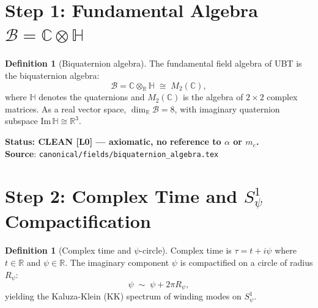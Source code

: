 \documentclass[12pt,a4paper]{article}
\theoremstyle{definition}
\newtheorem{definition}[theorem]{Definition}
\theoremstyle{remark}
\begin{document}
\section{Step 1: Fundamental Algebra $\mathcal{B} = \mathbb{C}\otimes\mathbb{H}$}
\label{sec:bc:algebra}

\begin{definition}[Biquaternion algebra]
\label{def:bc:biquaternion}
The fundamental field algebra of UBT is the biquaternion algebra:
\begin{equation}
  \mathcal{B} = \mathbb{C}\otimes_{\mathbb{R}}\mathbb{H}
  \;\cong\; M_2(\mathbb{C}),
  \label{eq:bc:B_def}
\end{equation}
where $\mathbb{H}$ denotes the quaternions and $M_2(\mathbb{C})$ is the algebra
of $2\times2$ complex matrices.  As a real vector space,
$\dim_{\mathbb{R}}\mathcal{B} = 8$, with imaginary quaternion subspace
$\mathrm{Im}\,\mathbb{H} \cong \mathbb{R}^3$.
\end{definition}

\begin{resultbox}
\textbf{Status: CLEAN [L0] — axiomatic, no reference to $\alpha$ or $m_e$.}\\
\textbf{Source}: \texttt{canonical/fields/biquaternion\_algebra.tex}
\end{resultbox}

\section{Step 2: Complex Time and $S^1_\psi$ Compactification}
\label{sec:bc:compactification}

\begin{definition}[Complex time and $\psi$-circle]
\label{def:bc:complex_time}
Complex time is $\tau = t + i\psi$ where $t\in\mathbb{R}$ and $\psi\in\mathbb{R}$.
The imaginary component $\psi$ is compactified on a circle of radius $R_\psi$:
\begin{equation}
  \psi \;\sim\; \psi + 2\pi R_\psi,
  \label{eq:bc:psi_circle}
\end{equation}
yielding the Kaluza-Klein (KK) spectrum of winding modes on $S^1_\psi$.
\end{definition}
\end{document}

